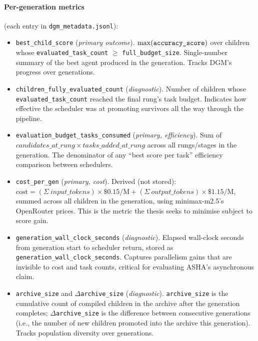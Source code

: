 \paragraph{Per-generation metrics} (each entry in
\texttt{dgm\_metadata.jsonl}):
\begin{itemize}
  \item \texttt{best\bk\_child\bk\_score} (\emph{primary outcome}).
    $\max(\texttt{accuracy\bk\_score})$ over children whose
    \texttt{evaluated\bk\_task\bk\_count} $\geq$
    \texttt{full\bk\_budget\bk\_size}. Single-number summary of the
    best agent produced in the generation. Tracks DGM's progress over
    generations.
  \item \texttt{children\_fully\_evaluated\_count}
    (\emph{diagnostic}). Number of children whose
    \texttt{evaluated\_task\_count} reached the final rung's task
    budget. Indicates how effective the scheduler was at promoting
    survivors all the way through the pipeline.
  \item \texttt{evaluation\_budget\_tasks\_consumed} (\emph{primary,
    efficiency}). Sum of
    $\mathit{candidates\_at\_rung} \times
    \mathit{tasks\_added\_at\_rung}$
    across all rungs/stages in the generation. The denominator of any
    ``best score per task'' efficiency comparison between schedulers.
  \item \texttt{cost\_per\_gen} (\emph{primary, cost}). Derived (not
    stored):
    $\text{cost} = (\Sigma\ \mathit{input\_tokens}) \times
    \$0.15/\text{M} + (\Sigma\ \mathit{output\_tokens}) \times
    \$1.15/\text{M}$,
    summed across all children in the generation, using
    minimax-m2.5's OpenRouter prices. This is the metric the thesis
    seeks to minimise subject to score gain.
  \item \texttt{generation\_wall\_clock\_seconds}
    (\emph{diagnostic}). Elapsed wall-clock seconds from generation
    start to scheduler return, stored as
    \texttt{generation\_wall\_clock\_seconds}. Captures parallelism
    gains that are invisible to cost and task counts, critical for
    evaluating ASHA's asynchronous claim.
  \item \texttt{archive\_size} and $\Delta$\texttt{archive\_size}
    (\emph{diagnostic}). \texttt{archive\_size} is the cumulative
    count of compiled children in the archive after the generation
    completes; $\Delta$\texttt{archive\_size} is the difference
    between consecutive generations (i.e., the number of new children
    promoted into the archive this generation). Tracks population
    diversity over generations.
\end{itemize}

